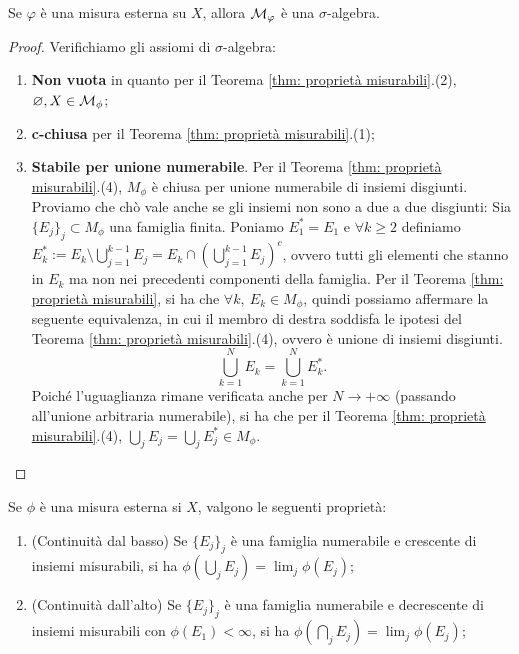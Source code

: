 \begin{proposition}[$\circ$]\label{prop: misurabili sigma-algebra} Se $\varphi$ è una misura esterna su $X$, allora $\mathcal{M}_{\varphi}$ è una $\sigma$-algebra.
\end{proposition}
\begin{proof}
  Verifichiamo gli assiomi di $\sigma$-algebra:
  \begin{enumerate}[label=$\roman*)$]
      \item [\textbullet] \textbf{Non vuota} in quanto per il Teorema \ref{thm: proprietà misurabili}.(2), $\varnothing, X \in \mathcal{M}_\phi$;
      \item \textbf{c-chiusa} per il Teorema \ref{thm: proprietà misurabili}.(1);
      \item \textbf{Stabile per unione numerabile}. Per il Teorema \ref{thm: proprietà misurabili}.(4), $M_\phi$ è chiusa per unione numerabile di insiemi disgiunti. Proviamo che chò vale anche se gli insiemi non sono a due a due disgiunti: Sia $\{E_j\}_j\subset M_\phi$ una famiglia finita. Poniamo $E_1^*=E_1$ e $\forall k\geq 2$ definiamo $E_k^*:=E_k\setminus \bigcup_{j=1}^{k-1}E_j = E_k\cap \left( \bigcup_{j=1}^{k-1}E_j \right)^c$, ovvero tutti gli elementi che stanno in $E_k$ ma non nei precedenti componenti della famiglia. Per il Teorema \ref{thm: proprietà misurabili}, si ha che $\forall k,\ E_k\in M_\phi$, quindi possiamo affermare la seguente equivalenza, in cui il membro di destra soddisfa le ipotesi del Teorema \ref{thm: proprietà misurabili}.(4), ovvero è unione di insiemi disgiunti.
      \[\bigcup_{k=1}^NE_k=\bigcup_{k=1}^NE_k^*.\]
      Poiché l'uguaglianza rimane verificata anche per $N\to +\infty$ (passando all'unione arbitraria numerabile), si ha che per il Teorema \ref{thm: proprietà misurabili}.(4), $\bigcup_{j} E_j= \bigcup_{j} E_j^*\in M_\phi$.
  \end{enumerate}
\end{proof}

\begin{shadedTheorem}[$**$]\label{thm: continuità misure esterne}
  Se $\phi$ è una misura esterna si $X$, valgono le seguenti proprietà:
  \begin{enumerate}[label=$(\arabic*)$]
      \item (Continuità dal basso) Se $\{E_j\}_j$ è una famiglia numerabile e crescente di insiemi misurabili, si ha $\phi\left(\bigcup_jE_j\right) = \lim_j\phi(E_j)$;
      \item (Continuità dall'alto) Se $\{E_j\}_j$ è una famiglia numerabile e decrescente di insiemi misurabili con $\phi(E_1)<\infty$,  si ha $\phi\left(\bigcap_jE_j\right) = \lim_j\phi(E_j)$;
  \end{enumerate}
\end{shadedTheorem}

